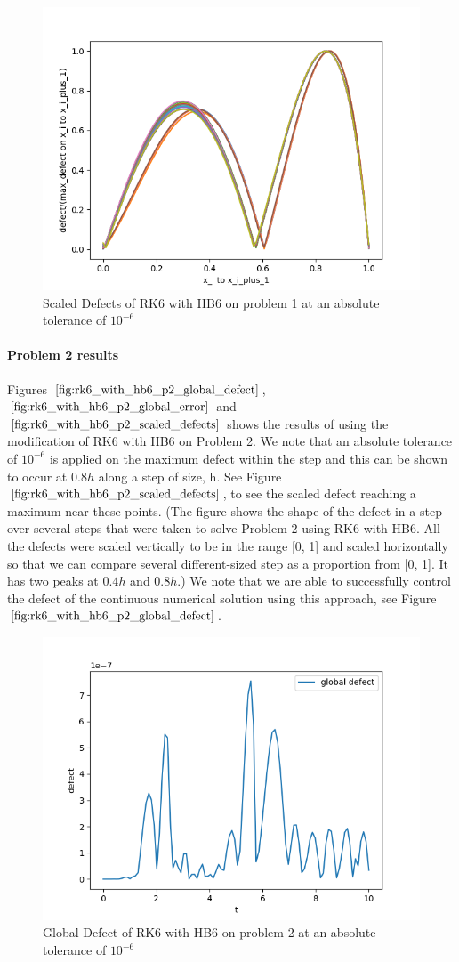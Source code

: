 \documentclass{article}
\begin{document}
\begin{figure}[H]
\centering
\includegraphics[width=0.7\linewidth]{./figures/rk6_with_hb6_p1_scaled_defects}
\caption{Scaled Defects of RK6 with HB6 on problem 1 at an absolute tolerance of $10^{-6}$}
\label{fig:rk6_with_hb6_p1_scaled_defects}
\end{figure}

\paragraph{Problem 2 results}
Figures $\ref{fig:rk6_with_hb6_p2_global_defect}$, $\ref{fig:rk6_with_hb6_p2_global_error}$ and $\ref{fig:rk6_with_hb6_p2_scaled_defects}$ shows the results of using the modification of RK6 with HB6 on Problem 2. We note that an absolute tolerance of $10^{-6}$ is applied on the maximum defect within the step and this can be shown to occur at $0.8h$ along a step of size, h. See Figure $\ref{fig:rk6_with_hb6_p2_scaled_defects}$, to see the scaled defect reaching a maximum near these points. (The figure shows the shape of the defect in a step over several steps that were taken to solve Problem 2 using RK6 with HB6. All the defects were scaled vertically to be in the range [0, 1] and scaled horizontally so that we can compare several different-sized step as a proportion from [0, 1]. It has two peaks at $0.4h$ and $0.8h$.) We note that we are able to successfully control the defect of the continuous numerical solution using this approach, see Figure $\ref{fig:rk6_with_hb6_p2_global_defect}$. 

\begin{figure}[H]
\centering
\includegraphics[width=0.7\linewidth]{./figures/rk6_with_hb6_p2_global_defect}
\caption{Global Defect of RK6 with HB6 on problem 2 at an absolute tolerance of $10^{-6}$}
\label{fig:rk6_with_hb6_p2_global_defect}
\end{figure}
\end{document}
